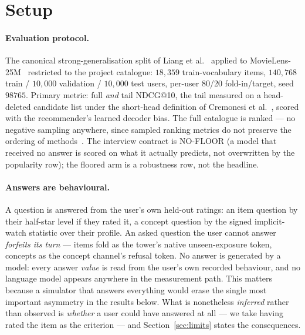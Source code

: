 \documentclass[11pt]{article}
\begin{document}
\section{Setup}
\label{sec:setup}

\paragraph{Evaluation protocol.} The canonical strong-generalisation split of Liang et
al.~\cite{liang2018variational} applied to MovieLens-25M~\cite{harper2015movielens} restricted to
the project catalogue: $18{,}359$ train-vocabulary items, $140{,}768$ train / $10{,}000$ validation
/ $10{,}000$ test users, per-user 80/20 fold-in/target, seed $98765$. Primary metric: full
\emph{and} tail NDCG@10, the tail measured on a head-deleted candidate list under the
short-head definition of Cremonesi et al.~\cite{cremonesi2010performance}, scored with the
recommender's learned decoder bias. The full catalogue is ranked --- no negative sampling anywhere,
since sampled ranking metrics do not preserve the ordering of
methods~\cite{krichene2020sampled}. The interview contract is NO-FLOOR (a model that received no
answer is scored on what it actually predicts, not overwritten by the popularity row); the floored
arm is a robustness row, not the headline.

\paragraph{Answers are behavioural.} A question is answered from the user's own held-out ratings:
an item question by their half-star level if they rated it, a concept question by the signed
implicit-watch statistic over their profile. An asked question the user cannot answer \emph{forfeits
its turn} --- items fold as the tower's native unseen-exposure token, concepts as the concept
channel's refusal token. No answer is generated by a model: every answer \emph{value} is read from
the user's own recorded behaviour, and no language model appears anywhere in the measurement path.
This matters because a simulator that answers everything would erase the single most important
asymmetry in the results below. What is nonetheless \emph{inferred} rather than observed is
\emph{whether} a user could have answered at all --- we take having rated the item as the criterion
--- and Section~\ref{sec:limits} states the consequences.
\end{document}
